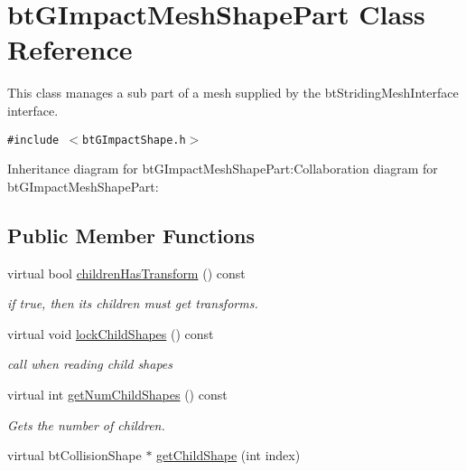 \hypertarget{classbt_g_impact_mesh_shape_part}{
\section{btGImpactMeshShapePart Class Reference}
\label{classbt_g_impact_mesh_shape_part}
}
This class manages a sub part of a mesh supplied by the btStridingMeshInterface interface.  


{\tt \#include $<$btGImpactShape.h$>$}

Inheritance diagram for btGImpactMeshShapePart:Collaboration diagram for btGImpactMeshShapePart:\subsection*{Public Member Functions}
\begin{CompactItemize}
\item 
\hypertarget{classbt_g_impact_mesh_shape_part_f18e961ae68efad13341caec2468f3be}{
virtual bool \hyperlink{classbt_g_impact_mesh_shape_part_f18e961ae68efad13341caec2468f3be}{childrenHasTransform} () const }
\label{classbt_g_impact_mesh_shape_part_f18e961ae68efad13341caec2468f3be}

\begin{CompactList}\small\item\em if true, then its children must get transforms. \item\end{CompactList}\item 
\hypertarget{classbt_g_impact_mesh_shape_part_9204e51eefb25e0733cef4791c937f28}{
virtual void \hyperlink{classbt_g_impact_mesh_shape_part_9204e51eefb25e0733cef4791c937f28}{lockChildShapes} () const }
\label{classbt_g_impact_mesh_shape_part_9204e51eefb25e0733cef4791c937f28}

\begin{CompactList}\small\item\em call when reading child shapes \item\end{CompactList}\item 
\hypertarget{classbt_g_impact_mesh_shape_part_95797b2cac67f4e41a03c3d901f3c085}{
virtual int \hyperlink{classbt_g_impact_mesh_shape_part_95797b2cac67f4e41a03c3d901f3c085}{getNumChildShapes} () const }
\label{classbt_g_impact_mesh_shape_part_95797b2cac67f4e41a03c3d901f3c085}

\begin{CompactList}\small\item\em Gets the number of children. \item\end{CompactList}\item 
\hypertarget{classbt_g_impact_mesh_shape_part_9dfb2b28e136ec3b08127f6b47cefb89}{
virtual btCollisionShape $\ast$ \hyperlink{classbt_g_impact_mesh_shape_part_9dfb2b28e136ec3b08127f6b47cefb89}{getChildShape} (int index)}
\label{classbt_g_impact_mesh_shape_part_9dfb2b28e136ec3b08127f6b47cefb89}


\end{CompactItemize}
